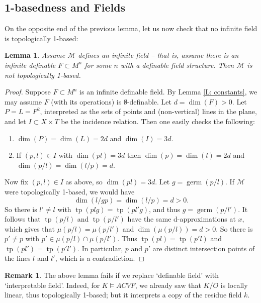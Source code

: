\documentclass{amsart}
\newtheorem{lemma}[theorem]{Lemma}
\theoremstyle{definition}
\newtheorem{remark}[theorem]{Remark}
\newcommand{\tp}{\operatorname{tp}}
\begin{document}
\subsection{1-basedness and Fields}

On the opposite end of the previous lemma, let us now check that no infinite field is topologically 1-based:

\begin{lemma}\label{L: no field}
    Assume $\mathcal M$ defines an infinite field -- that is, assume there is an infinite definable $F\subset M^n$ for some $n$ with a definable field structure. Then $\mathcal M$ is not topologically 1-based.
\end{lemma}
\begin{proof} Suppose $F\subset M^n$ is an infinite definable field. By Lemma \ref{L: constants}, we may assume $F$ (with its operations) is $\emptyset$-definable. Let $d=\dim(F)>0$. Let $P=L=F^2$, interpreted as the sets of points and (non-vertical) lines in the plane, and let $I\subset X\times T$ be the incidence relation. Then one easily checks the following:

\begin{enumerate}
    \item $\dim(P)=\dim(L)=2d$ and $\dim(I)=3d$. 
    \item If $(p,l)\in I$ with $\dim(pl)=3d$ then $\dim(p)=\dim(l)=2d$ and $\dim(p/l)=\dim(l/p)=d$.
\end{enumerate}

Now fix $(p,l)\in I$ as above, so $\dim(pl)=3d$. Let $g=\operatorname{germ}(p/l)$. If $\mathcal M$ were topologically 1-based, we would have $$\dim(l/gp)=\dim(l/p)=d>0.$$ So there is $l'\neq l$ with $\tp(plg)=\tp(pl'g)$, and thus $g=\operatorname{germ}(p/l')$. It follows that $\tp(p/l)$ and $\tp(p/l')$ have the same d-approximations at $x$, which gives that $\mu(p/l)=\mu(p/l')$ and $\dim(\mu(p/l))=d>0$. So there is $p'\neq p$ with $p'\in\mu(p/l)\cap\mu(p/l')$. Thus $\tp(pl)=\tp(p'l)$ and $\tp(pl')=\tp(p'l')$. In particular, $p$ and $p'$ are distinct intersection points of the lines $l$ and $l'$, which is a contradiction. 
\end{proof}

\begin{remark} The above lemma fails if we replace `definable field' with `interpretable field'. Indeed, for $K\models ACVF$, we already saw that $K/O$ is locally linear, thus topologically 1-based; but it interprets a copy of the residue field $k$.
\end{remark}
\end{document}
